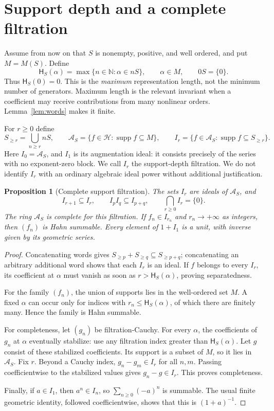 \documentclass[11pt,a4paper]{article}
\newtheorem{proposition}[theorem]{Proposition}
\theoremstyle{definition}
\theoremstyle{remark}
\newcommand{\N}{\mathbb N}
\newcommand{\HH}{\mathscr H}
\newcommand{\AS}{\mathscr A_S}
\newcommand{\supp}{\operatorname{supp}}
\newcommand{\depth}{\mathsf H}
\begin{document}
\section{Support depth and a complete filtration}
\label{sec:filtration}

Assume from now on that $S$ is nonempty, positive, and well ordered, and put
$M=M(S)$. Define
\begin{equation}\label{eq:depth}
 \depth_S(\alpha)=\max\{n\in\N:\alpha\in nS\},\qquad \alpha\in M,
 \qquad 0S=\{0\}.
\end{equation}
Thus $\depth_S(0)=0$. This is the \emph{maximum} representation length, not
the minimum number of generators. Maximum length is the relevant invariant
when a coefficient may receive contributions from many nonlinear orders.
Lemma~\ref{lem:words} makes it finite.

For $r\ge0$ define
\begin{equation}\label{eq:Ir}
 S_{\ge r}=\bigcup_{n\ge r}nS,\qquad
 \AS=\{f\in\HH:\supp f\subseteq M\},\qquad
 I_r=\{f\in\AS:\supp f\subseteq S_{\ge r}\}.
\end{equation}
Here $I_0=\AS$, and $I_1$ is its augmentation ideal: it consists precisely
of the series with no exponent-zero block. We call $I_r$ the support-depth
filtration. We do not identify $I_r$ with an ordinary algebraic ideal power
without additional justification.

\begin{proposition}[Complete support filtration]\label{prop:complete}
The sets $I_r$ are ideals of $\AS$, and
\[
 I_{r+1}\subseteq I_r,\qquad I_pI_q\subseteq I_{p+q},\qquad
 \bigcap_{r\ge0}I_r=\{0\}.
\]
The ring $\AS$ is complete for this filtration. If $f_n\in I_{r_n}$ and
$r_n\to+\infty$ as integers, then $(f_n)$ is Hahn summable. Every element
of $1+I_1$ is a unit, with inverse given by its geometric series.
\end{proposition}
\begin{proof}
Concatenating words gives $S_{\ge p}+S_{\ge q}\subseteq S_{\ge p+q}$;
concatenating an arbitrary additional word shows that each $I_r$ is an
ideal. If $f$ belongs to every $I_r$, its coefficient at $\alpha$ must vanish
as soon as $r>\depth_S(\alpha)$, proving separatedness.

For the family $(f_n)$, the union of supports lies in the well-ordered set
$M$. A fixed $\alpha$ can occur only for indices with
$r_n\le\depth_S(\alpha)$, of which there are finitely many. Hence the family
is Hahn summable.

For completeness, let $(g_n)$ be filtration-Cauchy. For every $\alpha$, the
coefficients of $g_n$ at $\alpha$ eventually stabilize: use any filtration
index greater than $\depth_S(\alpha)$. Let $g$ consist of these stabilized
coefficients. Its support is a subset of $M$, so it lies in $\AS$. Fix $r$.
Beyond a Cauchy index, $g_n-g_m\in I_r$ for all $n,m$. Passing coefficientwise
to the stabilized values gives $g_n-g\in I_r$. This proves completeness.

Finally, if $a\in I_1$, then $a^n\in I_n$, so $\sum_{n\ge0}(-a)^n$ is
summable. The usual finite geometric identity, followed coefficientwise,
shows that this is $(1+a)^{-1}$.
\end{proof}
\end{document}
